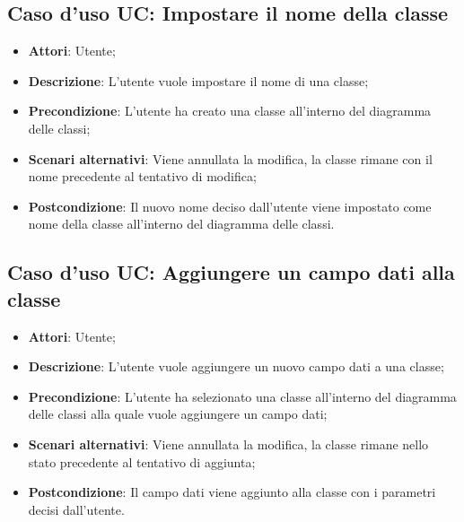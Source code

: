 \documentclass[../AnalisiDeiRequisiti.tex]{subfiles}
\begin{document}
			\subsection{Caso d'uso UC: Impostare il nome della classe}
			\begin{itemize}
				\item \textbf{Attori}: Utente;
				
				\item \textbf{Descrizione}: L'utente vuole impostare il nome di una classe;
				
				\item \textbf{Precondizione}: L'utente ha creato una classe all'interno del diagramma delle classi;
				
				\item \textbf{Scenari alternativi}: Viene annullata la modifica, la classe
				rimane con il nome precedente al tentativo di modifica;
				
				\item \textbf{Postcondizione}: Il nuovo nome deciso dall'utente viene impostato come nome della classe all'interno del diagramma delle classi.
			\end{itemize}
			
			\subsection{Caso d'uso UC: Aggiungere un campo dati alla classe}
			\begin{itemize}
				\item \textbf{Attori}: Utente;
				
				\item \textbf{Descrizione}: L'utente vuole aggiungere un nuovo campo dati a una classe;
				
				\item \textbf{Precondizione}: L'utente ha selezionato una classe all'interno del diagramma delle classi alla quale vuole aggiungere un campo dati;
				
				\item \textbf{Scenari alternativi}: Viene annullata la modifica, la classe
				rimane nello stato precedente al tentativo di aggiunta;
				
				\item \textbf{Postcondizione}: Il campo dati viene aggiunto alla classe con i parametri decisi dall'utente.
			\end{itemize}
			
\end{document}
